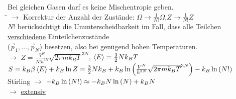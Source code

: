 \begin{tabbing}
Bei gleichen Gasen darf es keine Mischentropie geben.\\
\hspace{4em} \= \kill
$\rightarrow$\> Korrektur der Anzahl der Zustände: $\Omega \to \frac{1}{N!} \Omega$,$Z \to \frac{1}{N!}Z$\\
$N!$ berücksichtigt die Ununterscheidbarkeit im Fall, dass alle Teilchen \uline{verschiedene} Einteilchenzustände\\ ($\vec{p}_1,\dots,\vec{p}_N$) besetzen, also bei genügend hohen Temperaturen.\\
$\rightarrow$\> $Z = \frac{V^N}{N!h^{3N}} \sqrt{2\pi m k_B T}^{3N}$, $\left\langle E \right\rangle = \frac32 N k_B T$\\
\> $S = k_B \beta \left\langle E \right\rangle + k_B \ln Z = \frac32 N k_B + k_B \ln\left( \frac{V^N}{h^{3N}}\sqrt{2\pi m k_B T}^{3N} \right) - k_B \ln\left( N! \right)$\\
Stirling $\rightarrow$\> $-k_B \ln\left( N! \right) \approx - k_B N \ln\left( N \right) + k_B N$\\
$\rightarrow$\>  \uline{extensiv}
\end{tabbing}


